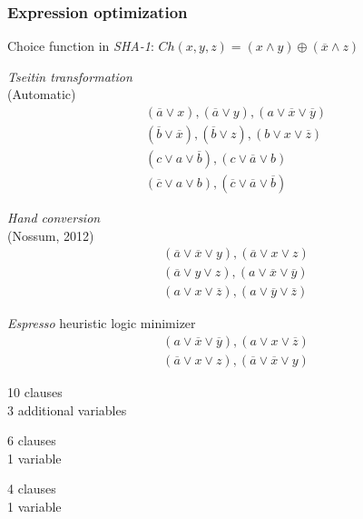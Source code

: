 \documentclass{beamer}
\begin{document}
\begin{frame}
\frametitle{Expression optimization}
Choice function in \emph{SHA-1}: $Ch(x, y, z) = (x \land y) \oplus (\overline{x} \land z)$
\vfill
\begin{minipage}[t][][t]{.35\textwidth}
\emph{Tseitin transformation}\\(Automatic)
{\small \begin{align*}
(\overline{a} \lor x), (\overline{a} \lor y), (a \lor \overline{x} \lor \overline{y}) \\
(\overline{b} \lor \overline{x}), (\overline{b} \lor z), (b \lor x \lor \overline{z})\\
(c \lor a \lor \overline{b}), (c \lor \overline{a} \lor b) \\
(\overline{c} \lor a \lor b), (\overline{c} \lor \overline{a} \lor \overline{b})
\end{align*}}%
\end{minipage}
\begin{minipage}[t][][t]{.3\textwidth}
\emph{Hand conversion}\\(Nossum, 2012)
{\small \begin{align*}
(\overline{a} \lor \overline{x} \lor y), (\overline{a} \lor x \lor z) \\
(\overline{a} \lor y \lor z), (a \lor \overline{x} \lor \overline{y}) \\
(a \lor x \lor \overline{z}), (a \lor \overline{y} \lor \overline{z})
\end{align*}}%
\end{minipage}
\begin{minipage}[t][][t]{.25\textwidth}
\emph{Espresso} heuristic logic minimizer
{\small \begin{align*}
(a \lor \overline{x} \lor \overline{y}), (a \lor x \lor \overline{z})\\
(\overline{a} \lor x \lor z), (\overline{a} \lor \overline{x} \lor y)
\end{align*}}%
\end{minipage}
\begin{minipage}[b][][b]{0.35\textwidth}
10 clauses\\
3 additional variables\end{minipage}
\begin{minipage}[b][][b]{0.3\textwidth}
6 clauses\\
1 variable
\end{minipage}
\begin{minipage}[b][][b]{0.25\textwidth}
4 clauses\\
1 variable
\end{minipage}
\end{frame}
\end{document}
